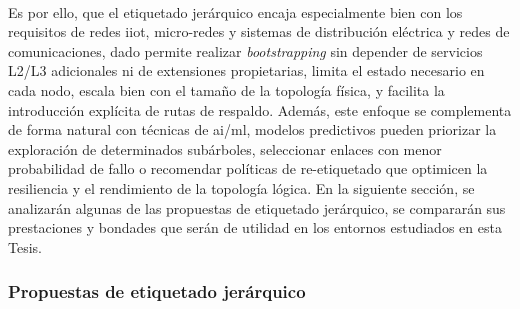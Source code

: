 \\
Es por ello, que el etiquetado jerárquico encaja especialmente bien con los requisitos de redes \gls{iiot}, micro-redes y sistemas de distribución eléctrica y redes de comunicaciones, dado permite realizar \textit{bootstrapping} sin depender de servicios L2/L3 adicionales ni de extensiones propietarias, limita el estado necesario en cada nodo, escala bien con el tamaño de la topología física, y facilita la introducción explícita de rutas de respaldo. Además, este enfoque se complementa de forma natural con técnicas de \gls{ai}/\gls{ml}, modelos predictivos pueden priorizar la exploración de determinados subárboles, seleccionar enlaces con menor probabilidad de fallo o recomendar políticas de re-etiquetado que optimicen la resiliencia y el rendimiento de la topología lógica. En la siguiente sección, se analizarán algunas de las propuestas de etiquetado jerárquico, se compararán sus prestaciones y bondades que serán de utilidad en los entornos estudiados en esta Tesis.



\subsubsection{Propuestas de etiquetado jerárquico}
\label{subsubsec:propuestas_etiquetado}

